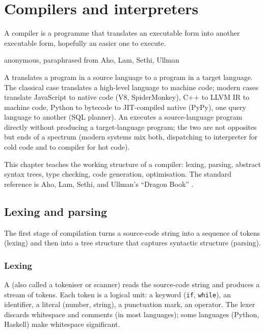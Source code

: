 \chapter{Compilers and interpreters}
\label{vol07:ch08}

\epigraph{A compiler is a programme that translates an executable form into another executable form, hopefully an easier one to execute.}{anonymous, paraphrased from Aho, Lam, Sethi, Ullman}


\noindent
A  translates a program in a source language to a program in a target language. The classical case translates a high-level language to machine code; modern cases translate JavaScript to native code (V8, SpiderMonkey), C++ to LLVM IR to machine code, Python to bytecode to JIT-compiled native (PyPy), one query language to another (SQL planner). An  executes a source-language program directly without producing a target-language program; the two are not opposites but ends of a spectrum (modern systems mix both, dispatching to interpreter for cold code and to compiler for hot code).

This chapter teaches the working structure of a compiler: lexing, parsing, abstract syntax trees, type checking, code generation, optimisation. The standard reference is Aho, Lam, Sethi, and Ullman's ``Dragon Book'' \cite{text:aho-dragon}.

\section{Lexing and parsing}

The first stage of compilation turns a source-code string into a sequence of tokens (lexing) and then into a tree structure that captures syntactic structure (parsing).

\subsection{Lexing}

A  (also called a tokeniser or scanner) reads the source-code string and produces a stream of tokens. Each token is a logical unit: a keyword (\texttt{if}, \texttt{while}), an identifier, a literal (number, string), a punctuation mark, an operator. The lexer discards whitespace and comments (in most languages); some languages (Python, Haskell) make whitespace significant.

